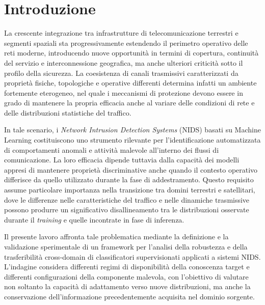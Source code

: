 
\chapter{Introduzione}
\label{ch:introduzione}

La crescente integrazione tra infrastrutture di telecomunicazione terrestri e segmenti spaziali sta progressivamente estendendo il perimetro operativo delle reti moderne, introducendo nuove opportunità in termini di copertura, continuità del servizio e interconnessione geografica, ma anche ulteriori criticità sotto il profilo della sicurezza. 
La coesistenza di canali trasmissivi caratterizzati da proprietà fisiche, topologiche e operative differenti determina infatti un ambiente fortemente eterogeneo, nel quale i meccanismi di protezione devono essere in grado di mantenere la propria efficacia anche al variare delle condizioni di rete e delle distribuzioni statistiche del traffico.

In tale scenario, i \textit{Network Intrusion Detection Systems} (NIDS) basati su Machine Learning costituiscono uno strumento rilevante per l'identificazione automatizzata di comportamenti anomali e attività malevole all'interno dei flussi di comunicazione. 
La loro efficacia dipende tuttavia dalla capacità dei modelli appresi di mantenere proprietà discriminative anche quando il contesto operativo differisce da quello utilizzato durante la fase di addestramento. 
Questo requisito assume particolare importanza nella transizione tra domini terrestri e satellitari, dove le differenze nelle caratteristiche del traffico e nelle dinamiche trasmissive possono produrre un significativo disallineamento tra le distribuzioni osservate durante il \textit{training} e quelle incontrate in fase di inferenza.

Il presente lavoro affronta tale problematica mediante la definizione e la validazione sperimentale di un framework per l'analisi della robustezza e della trasferibilità cross-domain di classificatori supervisionati applicati a sistemi NIDS. 
L'indagine considera differenti regimi di disponibilità della conoscenza target e differenti configurazioni della componente malevola, con l'obiettivo di valutare non soltanto la capacità di adattamento verso nuove distribuzioni, ma anche la conservazione dell'informazione precedentemente acquisita nel dominio sorgente.

